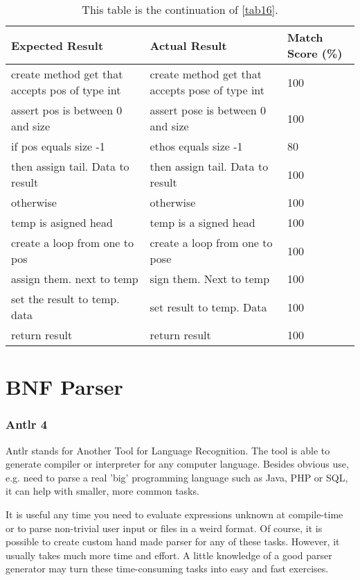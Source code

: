 \begin{table}[H]
	\centering
	\begin{tabular}{|p{6cm}|p{6cm}|p{2cm}|}
		\hline
		{\bf Expected Result} & {\bf Actual Result} & {\bf Match Score (\%)} \\ \hline
		create method get that accepts pos of type int & create method get that accepts pose of type int & 100 \\ \hline
		assert pos is between 0 and size & assert pose is between 0 and size & 100 \\ \hline
		if pos equals size -1 & ethos equals size -1 & 80 \\ \hline
		then assign tail. Data to result & then assign tail. Data to result & 100 \\ \hline
		otherwise & otherwise & 100 \\ \hline
		temp is asigned head & temp is a signed head & 100 \\ \hline
		create a loop from one to pos & create a loop from one to pose & 100 \\ \hline
		assign them. next to temp & sign them. Next to temp & 100 \\ \hline
		set the result to temp. data & set result to temp. Data & 100 \\ \hline
		return result & return result & 100 \\ \hline
	\end{tabular}
	\caption{This table is the continuation of \autoref{tab16}.}
	\label{tab17}
\end{table} 
\section{BNF Parser} \label{section:BNF Parser}
\subsubsection{Antlr 4}
Antlr stands for Another Tool for Language Recognition. The tool is able to generate compiler or interpreter for any computer language. Besides obvious use, e.g. need to parse a real 'big' programming language such as Java, PHP or SQL, it can help with smaller, more common tasks.

It is useful any time you need to evaluate expressions unknown at compile-time or to parse non-trivial user input or files in a weird format. Of course, it is possible to create custom hand made parser for any of these tasks. However, it usually takes much more time and effort. A little knowledge of a good parser generator may turn these time-consuming tasks into easy and fast exercises.


